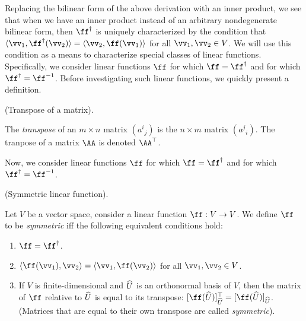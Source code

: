 Replacing the bilinear form of the above derivation with an inner product, we see that when we have an inner product instead of an arbitrary nondegenerate bilinear form, then $\ff^\dag$ is uniquely characterized by the condition that $\langle \vv_1, \ff^\dag(\vv_2) \rangle = \langle \vv_2, \ff(\vv_1) \rangle$ for all $\vv_1, \vv_2 \in V$. We will use this condition as a means to characterize special classes of linear functions. Specifically, we consider linear functions $\ff$ for which $\ff = \ff^\dag$ and for which $\ff^\dag = \ff^{-1}$. Before investigating such linear functions, we quickly present a definition.

\begin{defn}
    (Transpose of a matrix).
    
    The \textit{transpose} of an $m \times n$ matrix $(a^i{}_j)$ is the $n \times m$ matrix $(a^j{}_i)$. The tranpose of a matrix $\AA$ is denoted $\AA^\top$.
\end{defn}

Now, we consider linear functions $\ff$ for which $\ff = \ff^\dag$ and for which $\ff^\dag = \ff^{-1}$.

\begin{defn} 
\label{ch::bilinear_forms_metric_tensors::defn::symmetric_linear_fn}
    (Symmetric linear function).

    Let $V$ be a vector space, consider a linear function $\ff:V \rightarrow V$. We define $\ff$ to be \textit{symmetric} iff the following equivalent conditions hold:
    
    \begin{enumerate}
        \item $\ff = \ff^\dag$.
        \item $\langle \ff(\vv_1), \vv_2 \rangle = \langle \vv_1, \ff(\vv_2) \rangle$ for all $\vv_1, \vv_2 \in V$.
        \item If $V$ is finite-dimensional and $\widehat{U}$ is an orthonormal basis of $V$, then the matrix of $\ff$ relative to $\widehat{U}$ is equal to its transpose: $[\ff(\hU)]_{\hU}^\top = [\ff(\hU)]_{\hU}$. (Matrices that are equal to their own transpose are called \textit{symmetric}).
    \end{enumerate}
\end{defn}
        
